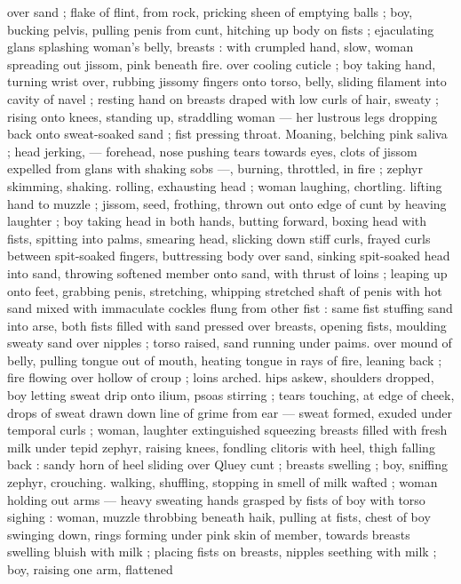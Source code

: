 over sand ; flake of flint, from rock, pricking sheen of emptying balls 
; boy, bucking pelvis, pulling penis from cunt, hitching up body on 
fists ; ejaculating glans splashing woman's belly, breasts : with 
crumpled hand, slow, woman spreading out jissom, pink beneath fire. 
over cooling cuticle ; boy taking hand, turning wrist over, rubbing 
jissomy fingers onto torso, belly, sliding filament into cavity of navel 
; resting hand on breasts draped with low curls of hair, sweaty ; rising 
onto knees, standing up, straddling woman --- her lustrous legs 
dropping back onto sweat-soaked sand ; fist pressing throat. 
Moaning, belching pink saliva ; head jerking, --- forehead, nose 
pushing tears towards eyes, clots of jissom expelled from glans with 
shaking sobs ---, burning, throttled, in fire ; zephyr skimming, 
shaking. rolling, exhausting head ; woman laughing, chortling. lifting 
hand to muzzle ; jissom, seed, frothing, thrown out onto edge of cunt 
by heaving laughter ; boy taking head in both hands, butting forward, 
boxing head with fists, spitting into palms, smearing head, slicking 
down stiff curls, frayed curls between spit-soaked fingers, 
buttressing body over sand, sinking spit-soaked head into sand, 
throwing softened member onto sand, with thrust of loins ; leaping 
up onto feet, grabbing penis, stretching, whipping stretched shaft of 
penis with hot sand mixed with immaculate cockles flung from other 
fist : same fist stuffing sand into arse, both fists filled with sand 
pressed over breasts, opening fists, moulding sweaty sand over 
nipples ; torso raised, sand running under paims. over mound of 
belly, pulling tongue out of mouth, heating tongue in rays of fire, 
leaning back ; fire flowing over hollow of croup ; loins arched. hips 
askew, shoulders dropped, boy letting sweat drip onto ilium, psoas 
stirring ; tears touching, at edge of cheek, drops of sweat drawn 
down line of grime from ear --- sweat formed, exuded under 
temporal curls ; woman, laughter extinguished squeezing breasts 
filled with fresh milk under tepid zephyr, raising knees, fondling 
clitoris with heel, thigh falling back : sandy horn of heel sliding over 
Qluey cunt ; breasts swelling ; boy, sniffing zephyr, crouching. 
walking, shuffling, stopping in smell of milk wafted ; woman holding 
out arms --- heavy sweating hands grasped by fists of boy with torso 
sighing : woman, muzzle throbbing beneath haik, pulling at fists, 
chest of boy swinging down, rings forming under pink skin of 
member, towards breasts swelling bluish with milk ; placing fists on 
breasts, nipples seething with milk ; boy, raising one arm, flattened 
